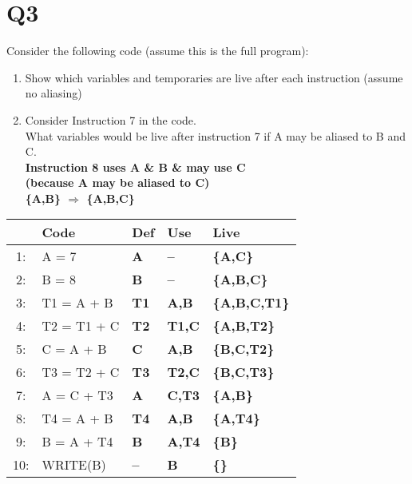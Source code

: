 \documentclass{report}
\begin{document}
\section{Q3}
Consider the following code (assume this is the full program):
\vspace{-1em}
\begin{multicols}{2}
\begin{enumerate}
  \item Show which variables and temporaries are live after each instruction (assume
no aliasing)
  \item Consider Instruction 7 in the code.\\
   What variables would be live after instruction 7 if A may be aliased to B and C. \\
   \textbf{Instruction 8 uses A \& B \& may use C \\
   (because A may be aliased to C) \\
   \{A,B\} $\Rightarrow$ \{A,B,C\}}
\end{enumerate}
  \begin{tabular}{|c|l|>{\bfseries}l|>{\bfseries}l|>{\bfseries}l|}
    \hline
  	& Code & Def & Use & Live \\
    \hline
     1: & A = 7       & A  & --   & \{A,C\}    \\
     2: & B = 8       & B  & --   & \{A,B,C\}  \\
     3: & T1 = A + B  & T1 & A,B  & \{A,B,C,T1\} \\
     4: & T2 = T1 + C & T2 & T1,C & \{A,B,T2\} \\
     5: & C = A + B   & C  & A,B  & \{B,C,T2\} \\
     6: & T3 = T2 + C & T3 & T2,C & \{B,C,T3\} \\
     7: & A = C + T3  & A  & C,T3 & \{A,B\}    \\
     8: & T4 = A + B  & T4 & A,B  & \{A,T4\}   \\
     9: & B = A + T4  & B  & A,T4 & \{B\}      \\
    10: & WRITE(B)    & -- & B    & \{\}       \\
    \hline
  \end{tabular}
\end{multicols}
\end{document}
